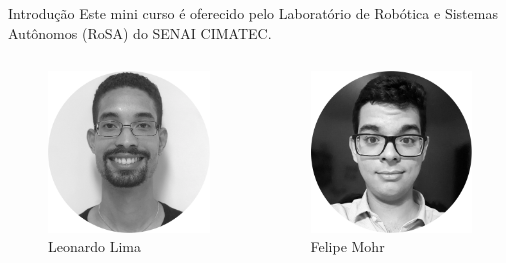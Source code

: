 \begin{frame}[t]{Introdução} 
    \transdissolve[duration=0.5]
    Este mini curso é oferecido pelo Laboratório de Robótica e Sistemas Autônomos (RoSA) do SENAI CIMATEC.

    \begin{columns}[t]
          \begin{center}
                \begin{figure}
                    \includegraphics[width=.55\linewidth]{leo.png}
                    \caption{Leonardo Lima}
                \end{figure}
            \end{center}            

        \begin{center}
            \begin{figure}
                \includegraphics[width=.55\linewidth]{felipe.png}
                \caption{Felipe Mohr}
            \end{figure}
        \end{center}
    \end{columns}
\end{frame}

